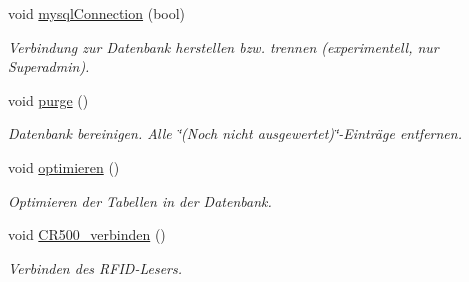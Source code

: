 \begin{CompactItemize}
void \hyperlink{class_b_e_o___timing_42c6266466562efb8e012cc0389767b7}{mysqlConnection} (bool)
\begin{CompactList}\small\item\em Verbindung zur Datenbank herstellen bzw. trennen (experimentell, nur Superadmin). \item\end{CompactList}\item 
void \hyperlink{class_b_e_o___timing_0736e099c5aa29e7169d74b5cd7da2d7}{purge} ()
\begin{CompactList}\small\item\em Datenbank bereinigen. Alle \char`\"{}(Noch nicht ausgewertet)\char`\"{}-Einträge entfernen. \item\end{CompactList}\item 
void \hyperlink{class_b_e_o___timing_85d0de732b79a53566feb1eb636c2886}{optimieren} ()
\begin{CompactList}\small\item\em Optimieren der Tabellen in der Datenbank. \item\end{CompactList}\item 
void \hyperlink{class_b_e_o___timing_6d5901b04efdce11f441205714385160}{CR500\_\-verbinden} ()
\begin{CompactList}\small\item\em Verbinden des RFID-Lesers. \item\end{CompactList}\end{CompactItemize}
